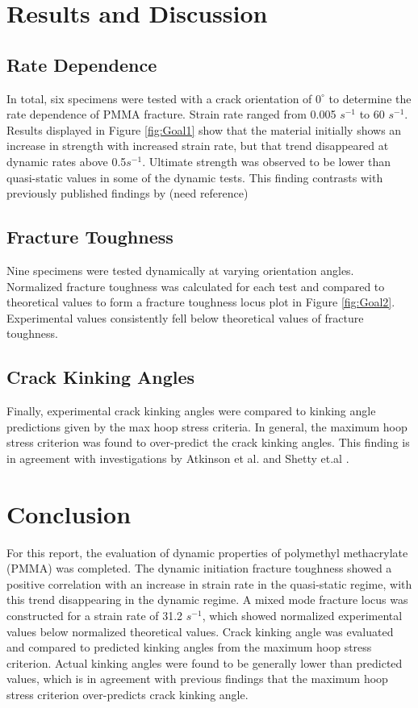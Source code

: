 \documentclass[12pt]{article}
\begin{document}
\section{Results and Discussion} %
\subsection{Rate Dependence}
In total, six specimens were tested with a crack orientation of $0^{\circ}$ to determine the rate dependence of PMMA fracture. Strain rate ranged from 0.005 $s^{-1}$ to 60 $s^{-1}$. Results displayed in Figure \ref{fig:Goal1} show that the material initially shows an increase in strength with increased strain rate, but that trend disappeared at dynamic rates above 0.5$s^{-1}$. Ultimate strength was observed to be lower than quasi-static values in some of the dynamic tests. This finding contrasts with previously published findings by (need reference) 
\subsection{Fracture Toughness}
Nine specimens were tested dynamically at varying orientation angles. Normalized fracture toughness was calculated for each test and compared to theoretical values to form a fracture toughness locus plot in Figure \ref{fig:Goal2}. Experimental values consistently fell below theoretical values of fracture toughness. 
\subsection{Crack Kinking Angles}
Finally, experimental crack kinking angles were compared to kinking angle predictions given by the max hoop stress criteria.  In general, the maximum hoop stress criterion was found to over-predict the crack kinking angles. This finding is in agreement with investigations by Atkinson et al. and Shetty et.al \cite{Atkinson} \cite{Shetty}.

\section{Conclusion} %
For this report, the evaluation of dynamic properties of polymethyl methacrylate (PMMA) was completed. The dynamic initiation fracture toughness showed a positive correlation with an increase in strain rate in the quasi-static regime, with this trend disappearing in the dynamic regime. A mixed mode fracture locus was constructed for a strain rate of 31.2 $s^{-1}$, which showed normalized experimental values below normalized theoretical values. Crack kinking angle was evaluated and compared to predicted kinking angles from the maximum hoop stress criterion. Actual kinking angles were found to be generally lower than predicted values, which is in agreement with previous findings that the maximum hoop stress criterion over-predicts crack kinking angle.
\end{document}
